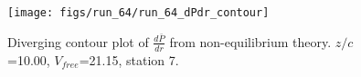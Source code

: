 \begin{figure}[H]
\centering
\texttt{[image: figs/run\_64/run\_64\_dPdr\_contour]}
\caption{Diverging contour plot of $\frac{d\bar{P}}{dr}$ from non-equilibrium theory. $z/c$=10.00, $V_{free}$=21.15, station 7.}
\label{fig:run_64_dPdr_contour}
\end{figure}


